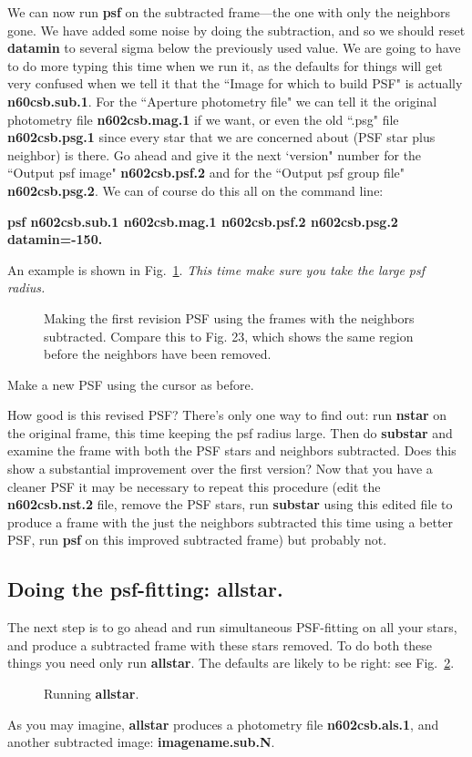 We can now run {\bf psf} on the subtracted frame---the one with only the
neighbors gone.  We have added some noise by doing the subtraction, and
so we should reset {\bf datamin} to several sigma below the previously
used
value. We are going to have to do more typing this time when
we run it, as the defaults for things will get very confused when we
tell it that the ``Image for which to build PSF" is actually
{\bf n60csb.sub.1}.  For the ``Aperture photometry file" we can tell
it the original photometry file {\bf n602csb.mag.1} if we want, or
even the old ``.psg" file {\bf n602csb.psg.1} since every star that
we are concerned about (PSF star plus neighbor) is there.  Go ahead
and give it the next `version" number for the ``Output psf image"
{\bf n602csb.psf.2} and for the ``Output psf group file" 
{\bf n602csb.psg.2}.  
We can of course do this all on the command line:
 
\centerline{ {\bf psf n602csb.sub.1 n602csb.mag.1 n602csb.psf.2
n602csb.psg.2 datamin=-150.} }
 
\noindent
An example is shown in Fig.~\ref{psf1}.  
{\it This time make sure you take the
large psf radius.}
\begin{figure}
\vspace{7.0in}
\caption{\label{psf1} Making the first revision PSF using the frames with the
neighbors subtracted. Compare this to Fig. 23, which shows the
same region before the neighbors have been removed.}
\end{figure}
Make a new PSF using the cursor as before.
 
How good is this revised PSF?  There's only one way to find out: run
{\bf nstar} on the original frame, this time keeping the psf radius large.
Then do {\bf substar} and examine the frame with both the PSF stars and
neighbors subtracted.  Does this show a substantial improvement over the
first version?  Now that you have a cleaner PSF it may be necessary to repeat
this procedure (edit the {\bf n602csb.nst.2} file, remove the PSF stars,
run {\bf substar} using this edited file to produce a frame with the
just the neighbors subtracted this time using a better PSF, run {\bf psf}
on this improved subtracted frame) but probably not.
 
\subsection{Doing the psf-fitting: {\bf allstar}.}
The next step is to go ahead and run simultaneous PSF-fitting on all
your stars, and produce a subtracted frame with these stars removed.
To do both these things you need only run {\bf allstar}.  The defaults
are likely to be right: see Fig.~\ref{allstar}.
\begin{figure}
\vspace{3.5in}
\caption{\label{allstar} Running {\bf allstar}.}
\end{figure}
As you may imagine, {\bf allstar} produces a photometry file
{\bf n602csb.als.1}, and another subtracted image: {\bf imagename.sub.N}.
 
